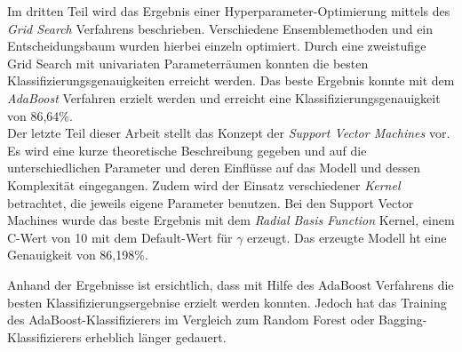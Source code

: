 \noindent \hspace*{7mm}
Im dritten Teil wird das Ergebnis einer Hyperparameter-Optimierung mittels des \emph{Grid Search} Verfahrens beschrieben. Verschiedene Ensemblemethoden und ein Entscheidungsbaum wurden hierbei einzeln optimiert. Durch eine zweistufige Grid Search mit univariaten Parameterräumen konnten die besten Klassifizierungsgenauigkeiten erreicht werden. Das beste Ergebnis konnte mit dem \emph{AdaBoost} Verfahren erzielt werden und erreicht eine Klassifizierungsgenauigkeit von 86,64\%.\\
\noindent \hspace*{7mm}
Der letzte Teil dieser Arbeit stellt das Konzept der \emph{Support Vector Machines} vor. Es wird eine kurze theoretische Beschreibung gegeben und auf die unterschiedlichen Parameter und deren Einflüsse auf das Modell und dessen Komplexität eingegangen. Zudem wird der Einsatz verschiedener \emph{Kernel} betrachtet, die jeweils eigene Parameter benutzen. Bei den Support Vector Machines wurde das beste Ergebnis mit dem \emph{Radial Basis Function} Kernel, einem C-Wert von 10 mit dem Default-Wert für $\gamma$ erzeugt. Das erzeugte Modell ht eine Genauigkeit von 86,198\%.\\
\noindent \hspace*{7mm}

Anhand der Ergebnisse ist ersichtlich, dass mit Hilfe des AdaBoost Verfahrens die besten Klassifizierungsergebnise erzielt werden konnten. Jedoch hat das Training des AdaBoost-Klassifizierers im Vergleich zum Random Forest oder Bagging-Klassifizierers erheblich länger gedauert. 